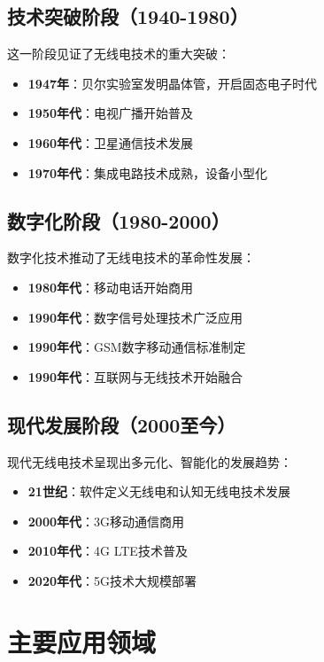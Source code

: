\documentclass[12pt,UTF8]{ctexbook}
\begin{document}
\section{技术突破阶段（1940-1980）}

这一阶段见证了无线电技术的重大突破：

\begin{itemize}[leftmargin=3.5em]
    \item \textbf{1947年}：贝尔实验室发明晶体管，开启固态电子时代
    \item \textbf{1950年代}：电视广播开始普及
    \item \textbf{1960年代}：卫星通信技术发展
    \item \textbf{1970年代}：集成电路技术成熟，设备小型化
\end{itemize}

\section{数字化阶段（1980-2000）}

数字化技术推动了无线电技术的革命性发展：

\begin{itemize}[leftmargin=3.5em]
    \item \textbf{1980年代}：移动电话开始商用
    \item \textbf{1990年代}：数字信号处理技术广泛应用
    \item \textbf{1990年代}：GSM数字移动通信标准制定
    \item \textbf{1990年代}：互联网与无线技术开始融合
\end{itemize}

\section{现代发展阶段（2000至今）}

现代无线电技术呈现出多元化、智能化的发展趋势：

\begin{itemize}[leftmargin=3.5em]
    \item \textbf{21世纪}：软件定义无线电和认知无线电技术发展
    \item \textbf{2000年代}：3G移动通信商用
    \item \textbf{2010年代}：4G LTE技术普及
    \item \textbf{2020年代}：5G技术大规模部署
\end{itemize}

\chapter{主要应用领域}
\end{document}
